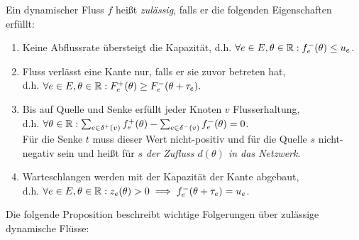 \begin{definition}
	Ein dynamischer Fluss $f$ heißt \emph{zulässig}, falls er die folgenden Eigenschaften erfüllt:
	\begin{enumerate}[label=(F\arabic*)]
		\item\label{def-feasible-flow-capacity} Keine Abflussrate übersteigt die Kapazität, d.h. $\forall e\in E, \theta\in\mathbb{R}: f_e^-(\theta)\leq u_e$.
		\item\label{def-feasible-flow-no-negative-flow} Fluss verlässt eine Kante nur, falls er sie zuvor betreten hat,\\ d.h. $\forall e\in E, \theta\in\mathbb{R}: F_e^+(\theta) \geq F_e^-(\theta + \tau_e).$
		\item\label{def-feasible-flow-no-flow-at-node} Bis auf Quelle und Senke erfüllt jeder Knoten $v$ Flusserhaltung,\\
		d.h. $\forall\theta\in\mathbb{R}: \sum_{e\in\delta^+(v)}f^+_e(\theta) - \sum_{e\in\delta^-(v)} f_e^-(\theta) = 0$.\\
		Für die Senke $t$ muss dieser Wert nicht-positiv und für die Quelle $s$ nicht-negativ sein und heißt für $s$ \emph{der Zufluss $d(\theta)$ in das Netzwerk}.
		\item\label{def-feasible-flow-queue-with-capacity} Warteschlangen werden mit der Kapazität der Kante abgebaut,\\ d.h. $\forall e\in E, \theta\in\mathbb{R}: z_e(\theta) > 0 \implies f_e^-(\theta + \tau_e) = u_e$.
	\end{enumerate}
\end{definition}

Die folgende Proposition beschreibt wichtige Folgerungen über zulässige dynamische Flüsse:

